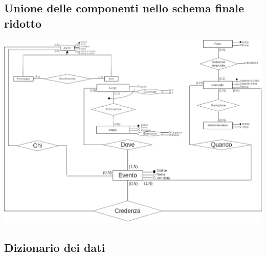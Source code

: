 \documentclass{article}
\begin{document}
\subsection{Unione delle componenti nello schema finale ridotto}
\includegraphics[width=\linewidth]{schema-finale.png}
\subsection{Dizionario dei dati}
\end{document}
